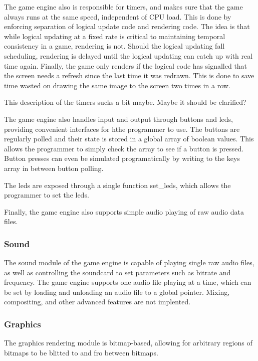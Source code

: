     The game engine also is responsible for timers, and makes sure that the game always runs at the same speed, independent of CPU load.
    This is done by enforcing separation of logical update code and rendering code.
    The idea is that while logical updating at a fixed rate is critical to maintaining temporal consistency in a game, rendering is not.
    Should the logical updating fall scheduling, rendering is delayed until the logical updating can catch up with real time again.
    Finally, the game only renders if the logical code has signalled that the screen needs a refresh since the last time it was redrawn. This is done to save time wasted on drawing the same image to the screen two times in a row.

    This description of the timers sucks a bit maybe. Maybe it should be clarified?


    The game engine also handles input and output through buttons and leds, providing convenient interfaces for hthe programmer to use.
    The buttons are regularly polled and their state is stored in a global array of boolean values.
    This allows the programmer to simply check the array to see if a button is pressed.
    Button presses can even be simulated programatically by writing to the keys array in between button polling.



    The leds are exposed through a single function set_leds, which allows the programmer to set the leds.


    Finally, the game engine also supports simple audio playing of raw audio data files.
    

	\subsubsection{Sound}
    The sound module of the game engine is capable of playing single raw audio files, as well as controlling the soundcard to set parameters such as bitrate and frequency.
    The game engine supports one audio file playing at a time, which can be set by loading and unloading an audio file to a global pointer.
    Mixing, compositing, and other advanced features are not implented.
	\subsubsection{Graphics}

    The graphics rendering module is bitmap-based, allowing for arbitrary regions of bitmaps to be blitted to and fro between bitmaps.


